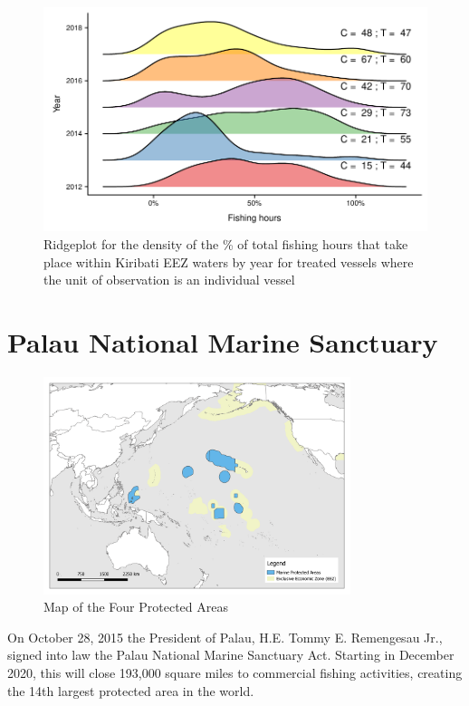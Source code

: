 \documentclass[9pttwoside,lineno]{pnas-new}
\begin{document}
\begin{figure}
\centering
\includegraphics{img/hist_kir_fishing.pdf}
\caption{\label{fig:hist_kir_fishing}Ridgeplot for the density of the \% of total fishing hours that take place
within Kiribati EEZ waters by year for treated vessels where the unit of observation is an individual vessel
}
\end{figure}


\clearpage

\section{Palau National Marine Sanctuary}\label{PNMS}

\begin{figure}[h]
	\includegraphics[width=0.8\textwidth]{img/Color_V1.png}
	\caption{Map of the Four Protected Areas}
	\label{fig:maps}
\end{figure}

On October 28, 2015 the President of Palau, H.E. Tommy E. Remengesau Jr., signed into law the Palau National Marine Sanctuary Act. Starting in December 2020, this will close 193,000 square miles to commercial fishing activities, creating the 14th largest protected area in the world. 
\end{document}
